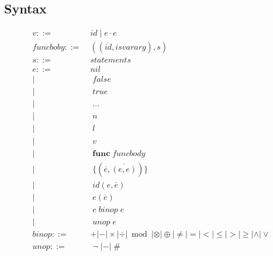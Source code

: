 \documentclass[12pt]{article}
\begin{document}
\subsection{Syntax}

\begin{align*}
v ::= \; & id \; | \; e \cdot e\\
funcboby ::= \; & ((\overline{id},isvararg),s)\\
s ::= \; & statements\\
e ::= \; & nil\\
| & \; false\\
| & \; true\\
| & \; {...}\\
| & \; n\\
| & \; l\\
| & \; v\\
| & \; \textbf{func} \; funcbody\\
| & \; \{(\overline{e},\overline{(e,e)})\}\\
| & \; id(e,\overline{e})\\
| & \; e(\overline{e})\\
| & \; e \; binop \; e\\
| & \; unop \; e\\
binop ::= & + | - | \times | \div | \bmod | \otimes | \oplus
  | \not= | = | < | \le | > | \ge | \land | \lor\\
unop ::= & \; \lnot \; | - | \; \#\\
\end{align*}
\end{document}
